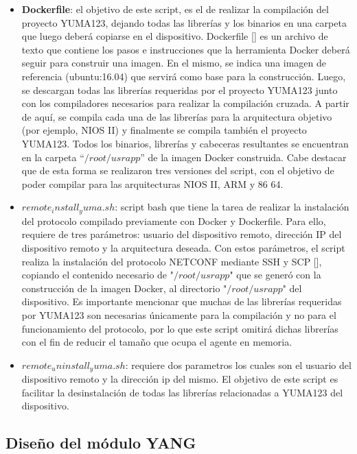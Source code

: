   \begin{itemize}
	\item \textbf{Dockerfile}: el objetivo de este script, es el de realizar la compilación del proyecto YUMA123, dejando todas las librerías y los binarios en una carpeta que luego deberá copiarse en el dispositivo. Dockerfile [] es un archivo de texto que contiene los pasos e instrucciones que la herramienta Docker deberá seguir para construir una imagen. En el mismo, se indica una imagen de referencia (ubuntu:16.04) que servirá como base para la construcción. Luego, se descargan todas las librerías requeridas por el proyecto YUMA123 junto con los compiladores necesarios para realizar la compilación cruzada. A partir de aquí, se compila cada una de las librerías para la arquitectura objetivo (por ejemplo, NIOS II) y finalmente se compila también el proyecto YUMA123. Todos los binarios, librerías y cabeceras resultantes se encuentran en la carpeta “$/root/usrapp$” de la imagen Docker construida. Cabe destacar que de esta forma se realizaron tres versiones del script, con el objetivo de poder compilar para las arquitecturas NIOS II, ARM y 86 64.
    
    \item \textbf{$remote_install_yuma.sh$}: script bash que tiene la tarea de realizar la instalación del protocolo compilado previamente con Docker y Dockerfile. Para ello, requiere de tres parámetros: usuario del dispositivo remoto, dirección IP del dispositivo remoto y la arquitectura deseada. Con estos parámetros, el script realiza la instalación del protocolo NETCONF mediante SSH y SCP [], copiando el contenido necesario de "$/root/usrapp$" que se generó con la construcción de la imagen Docker, al directorio "$/root/usrapp$" del dispositivo. Es importante mencionar que muchas de las librerías requeridas por YUMA123 son necesarias únicamente para la compilación y no para el funcionamiento del protocolo, por lo que este script omitirá dichas librerías con el fin de reducir el tamaño que ocupa el agente en memoria.
    
    \item \textbf{$remote_uninstall_yuma.sh$}: requiere dos parametros los cuales son el usuario del dispositivo remoto y la dirección ip del mismo. El objetivo de este script es facilitar la desinstalación de todas las librerías relacionadas a YUMA123 del dispositivo.

\end{itemize}


\subsection{Diseño del módulo YANG}


